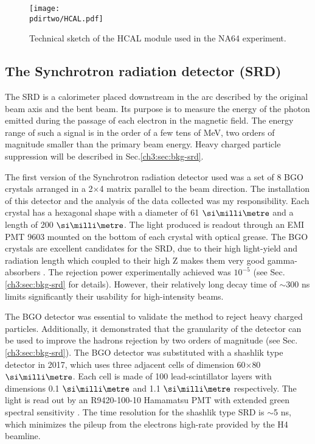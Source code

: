 \begin{figure}[bth!]
\centering
\texttt{[image: \\pdirtwo/HCAL.pdf]}
\caption[HCAL sketch]{Technical sketch of the HCAL module used in the NA64 experiment.}
\label{fig:hcal-sketch}
\end{figure}

\subsection{The Synchrotron radiation detector (SRD)}
\label{ch2:sec:detectors-srd}

The SRD is a calorimeter placed downstream in the arc described by the original beam axis and the bent beam. Its purpose is to measure the energy of the photon emitted during the passage of each electron in the magnetic field. The energy range of such a signal is in the order of a few tens of MeV, two orders of magnitude smaller than the primary beam energy. Heavy charged particle suppression will be described in Sec.\ref{ch3:sec:bkg-srd}.

The first version of the Synchrotron radiation detector used was a set of 8 BGO crystals arranged in a 2$\times$4 matrix parallel to the beam direction. The installation of this detector and the analysis of the data collected was my responsibility. Each crystal has a hexagonal shape with a diameter of 61 $\mmi$ and a length of 200 $\mmi$. The light produced is readout through an EMI PMT 9603 mounted on the bottom of each crystal with optical grease. The BGO crystals are excellent candidates for the SRD, due to their high light-yield and radiation length which coupled to their high Z makes them very good gamma-absorbers \cite{bgo-crystal}. The rejection power experimentally achieved was $10^{-5}$ (see Sec.\ref{ch3:sec:bkg-srd} for details). However, their relatively long decay time of $\sim$300 \si{ns} limits significantly their usability for high-intensity beams.

The BGO detector was essential to validate the method to reject heavy charged particles. Additionally, it demonstrated that the granularity of the detector can be used to improve the hadrons rejection by two orders of magnitude (see Sec.\ref{ch3:sec:bkg-srd}). The BGO detector was substituted with a shashlik type detector in 2017, which uses three adjacent cells of dimension 60$\times$80 $\mmi$. Each cell is made of 100 lead-scintillator layers with dimensions 0.1 $\mmi$ and 1.1 $\mmi$ respectively. The light is read out by an R9420-100-10 Hamamatsu PMT with extended green spectral sensitivity \cite{hamamatsu-R9420-100-10}. The time resolution for the shashlik type SRD is $\sim$5 \si{ns}, which minimizes the pileup from the electrons high-rate provided by the H4 beamline.

